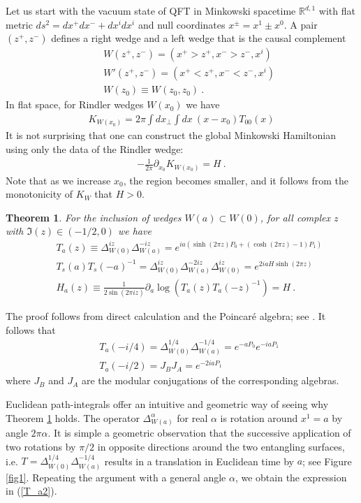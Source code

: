 \documentclass[a4paper,11pt]{article}
\newtheorem{theorem}{Theorem}
\theoremstyle{definition}
\newcommand{\nn}{\nonumber}
\newcommand{\p}{\partial}
\begin{document}
Let us start with the vacuum state of QFT in Minkowski spacetime $\mathbb{R}^{d,1}$ with flat metric $ds^2=dx^+dx^-+dx^idx^i$ and null coordinates $x^\pm=x^1\pm x^0$. A pair $(z^+,z^-)$ defines a right wedge and a left wedge that is the causal complement
\begin{eqnarray}
 &&W(z^+,z^-)=(x^+>z^+,x^->z^-,x^i)\nn\\
 &&W'(z^+,z^-)=(x^+<z^+,x^-<z^-,x^i)\nn\\
 &&W(z_0)\equiv W(z_0,z_0)\ .
\end{eqnarray}
In flat space, for Rindler wedges $W(x_0)$ we have
\begin{eqnarray}
    K_{W(x_0)}=2\pi\int dx_\perp\int dx\: (x-x_0)T_{00}(x)
\end{eqnarray}
It is not surprising that one can construct the global Minkowski Hamiltonian using only the data of the Rindler wedge: 
\begin{eqnarray}
    -\frac{1}{2\pi}\p_{x_0}K_{W(x_0)}=H\ .
\end{eqnarray}
Note that as we increase $x_0$, the region becomes smaller, and it follows from the monotonicity of $K_W$ that $H>0$.
\begin{theorem}\label{thmRinlder}
    For the inclusion of wedges $W(a)\subset W(0)$, for all complex $z$ with $\Im(z)\in (-1/2,0)$ we have
    \begin{eqnarray}
    &&T_a(z)\equiv \Delta_{W(0)}^{iz}\Delta_{W(a)}^{-iz}=e^{i a(\sinh(2\pi z) P_0+(\cosh(2\pi z)-1)P_1)}\nn\\
    \label{equation:keyidentity}
    &&T_s(a)T_s(-a)^{-1}=\Delta_{W(0)}^{i z}\Delta_{W(a)}^{-2i z}\Delta_{W(0)}^{iz}=e^{2i a H\sinh(2\pi z)}\label{T_a2}\\
    &&H_a(z)\equiv \frac{1}{2\sin(2\pi iz)}\p_a \log (T_a(z)T_a(-z)^{-1})=H\ .
\end{eqnarray}
\end{theorem}
The proof follows from direct calculation and the Poincaré algebra; see \cite{buchholz2007nuclearity}. It follows that 
\begin{eqnarray}
    &&T_a(-i/4)=\Delta_{W(0)}^{1/4}\Delta_{W(a)}^{-1/4}=e^{-a P_0}e^{-i a P_1}\nn\\
    &&T_a(-i/2)=J_BJ_A=e^{-2ia P_1}
\end{eqnarray}
where $J_B$ and $J_A$ are the modular conjugations of the corresponding algebras.

Euclidean path-integrals offer an intuitive and geometric way of seeing why Theorem \ref{thmRinlder} holds. The operator $\Delta_{W(a)}^\alpha$ for real $\alpha$ is rotation around $x^1=a$ by angle $2\pi \alpha$.
It is simple a geometric observation that the successive application of two rotations by $\pi/2$ in opposite directions around the two entangling surfaces, i.e. $T=\Delta_{W(0)}^{1/4}\Delta_{W(a)}^{-1/4}$ results in a translation in Euclidean time by $a$; see Figure \ref{fig1}. Repeating the argument with a general angle $\alpha$, we obtain the expression in (\ref{T_a2}). 
\end{document}
